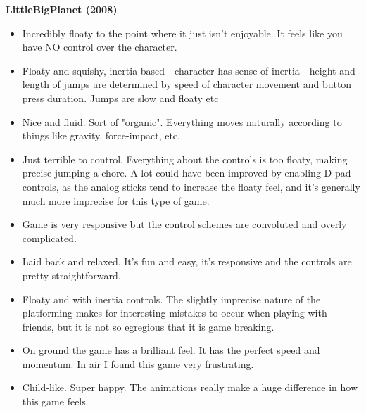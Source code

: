 \textbf{LittleBigPlanet (2008)}
\vspace{-5mm}
\begin{itemize}[noitemsep,nolistsep]
\item Incredibly floaty to the point where it just isn't enjoyable. It feels like you have NO control over the character.
\item Floaty and squishy, inertia-based - character has sense of inertia - height and length of jumps are determined by speed of character movement and button press duration. Jumps are slow and floaty etc
\item Nice and fluid. Sort of "organic". Everything moves naturally according to things like gravity, force-impact, etc.
\item Just terrible to control. Everything about the controls is too floaty, making precise jumping a chore. A lot could have been improved by enabling D-pad controls, as the analog sticks tend to increase the floaty feel, and it's generally much more imprecise for this type of game.
\item Game is very responsive but the control schemes are convoluted and overly complicated. 
\item Laid back and relaxed. It's fun and easy, it's responsive and the controls are pretty straightforward.
\item Floaty and with inertia controls. The slightly imprecise nature of the platforming makes for interesting mistakes to occur when playing with friends, but it is not so egregious that it is game breaking. 
\item On ground the game has a brilliant feel. It has the perfect speed and momentum. In air I found this game very frustrating.
\item Child-like. Super happy. The animations really make a huge difference in how this game feels.
\end{itemize}

